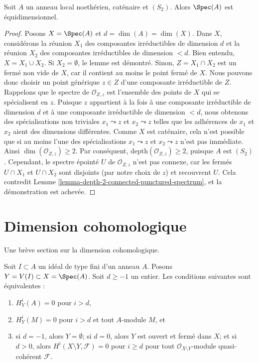 \begin{lemma}
\label{lemma-catenary-S2-equidimensional}
\begin{reference}
\cite[IV Corollary 5.10.9]{EGA}
\end{reference}
Soit $A$ un anneau local noethérien, caténaire et $(S_2)$.
Alors $\Spec(A)$ est équidimensionnel.
\end{lemma}

\begin{proof}
Posons $X = \Spec(A)$ et $d = \dim(A) = \dim(X)$. Dans $X$, considérons la
réunion $X_1$ des composantes irréductibles de dimension $d$ et la réunion
$X_2$ des composantes irréductibles de dimension $< d$. Bien entendu,
$X = X_1 \cup X_2$. Si $X_2 = \emptyset$,
le lemme est démontré. Sinon, $Z = X_1 \cap X_2$ est un fermé non vide
de $X$, car il contient au moins le point fermé de $X$.
Nous pouvons donc choisir un point générique $z \in Z$ d'une composante irréductible
de $Z$. Rappelons que le spectre de $\mathcal{O}_{Z, z}$ est l'ensemble des points
de $X$ qui se spécialisent en $z$. Puisque $z$ appartient à la fois à une
composante irréductible de dimension $d$ et à une composante irréductible
de dimension $< d$, nous obtenons des spécialisations non triviales $x_1 \leadsto z$ et
$x_2 \leadsto z$ telles que les adhérences de $x_1$ et $x_2$ aient des
dimensions différentes. Comme $X$ est caténaire, cela n'est possible que si au moins
l'une des spécialisations $x_1 \leadsto z$ et $x_2 \leadsto z$ n'est pas
immédiate. Ainsi $\dim(\mathcal{O}_{Z, z}) \geq 2$. Par conséquent,
$\text{depth}(\mathcal{O}_{Z, z}) \geq 2$, puisque $A$ est $(S_2)$.
Cependant, le spectre épointé $U$ de $\mathcal{O}_{Z, z}$ n'est pas connexe,
car les fermés $U \cap X_1$ et $U \cap X_2$ sont disjoints
(par notre choix de $z$) et recouvrent $U$. Cela contredit
Lemme \ref{lemma-depth-2-connected-punctured-spectrum},
et la démonstration est achevée.
\end{proof}



\section{Dimension cohomologique}
\label{section-cd}

\noindent
Une brève section sur la dimension cohomologique.

\begin{lemma}
\label{lemma-cd}
Soit $I \subset A$ un idéal de type fini d'un anneau $A$.
Posons $Y = V(I) \subset X = \Spec(A)$. Soit $d \geq -1$ un entier.
Les conditions suivantes sont équivalentes :
\begin{enumerate}
\item $H^i_Y(A) = 0$ pour $i > d$,
\item $H^i_Y(M) = 0$ pour $i > d$ et tout $A$-module $M$, et
\item si $d = -1$, alors $Y = \emptyset$; si $d = 0$, alors
$Y$ est ouvert et fermé dans $X$; et si $d > 0$, alors
$H^i(X \setminus Y, \mathcal{F}) = 0$ pour $i \geq d$
pour tout $\mathcal{O}_{X \setminus Y}$-module quasi-cohérent $\mathcal{F}$.
\end{enumerate}
\end{lemma}

